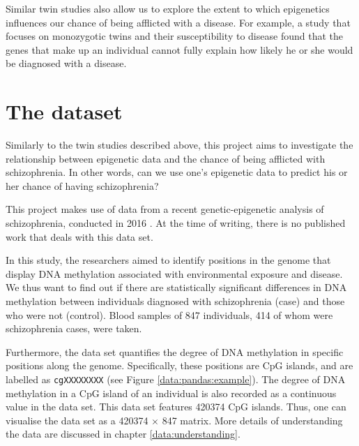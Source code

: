 \documentclass[12pt, twoside, a4paper]{report}
\begin{document}
Similar twin studies also allow us to explore the extent to which epigenetics influences our chance of being afflicted with a disease. For example, a study \cite{RefWorks:105} that focuses on monozygotic twins and their susceptibility to disease found that the genes that make up an individual cannot fully explain how likely he or she would be diagnosed with a disease.

\section{The dataset} \label{bg_genetic_data}

Similarly to the twin studies described above, this project aims to investigate the relationship between epigenetic data and the chance of being afflicted with schizophrenia. In other words, can we use one's epigenetic data to predict his or her chance of having schizophrenia?

This project makes use of data from a recent genetic-epigenetic analysis of schizophrenia, conducted in 2016 \cite{RefWorks:78}. At the time of writing, there is no published work that deals with this data set.


In this study, the researchers aimed to identify positions in the genome that display DNA methylation associated with environmental exposure and disease. We thus want to find out if there are statistically significant differences in DNA methylation between individuals diagnosed with schizophrenia (case) and those who were not (control). Blood samples of 847 individuals, 414 of whom were schizophrenia cases, were taken.

Furthermore, the data set quantifies the degree of DNA methylation in specific positions along the genome. Specifically, these positions are CpG islands, and are labelled as \texttt{cgXXXXXXXX} (see Figure \ref{data:pandas:example}). The degree of DNA methylation in a CpG island of an individual is also recorded as a continuous value in the data set. This data set features 420374 CpG islands. Thus, one can visualise the data set as a 420374 $\times$ 847 matrix. More details of understanding the data are discussed in chapter \ref{data:understanding}.

\end{document}
